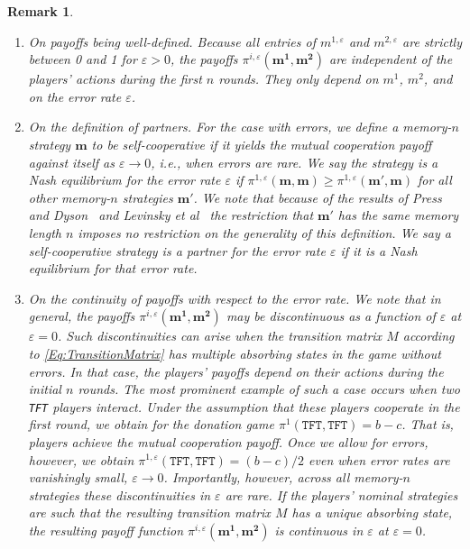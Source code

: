 \documentclass[9pt,twoside,lineno]{pnas-new}
\theoremstyle{plainCl1}
\theoremstyle{plainCl2}
\newtheorem{remark}{Remark}
\def\tft{\texttt{TFT}}
\begin{document}
\begin{remark} \label{Rem:Errors}
\begin{enumerate}[label=({\it \roman*})]

\item {\it On payoffs being well-defined.} Because all entries of $m^{1,\varepsilon}$ and $m^{2,\varepsilon}$ are strictly between 0 and 1 for $\varepsilon\!>\!0$, the payoffs $\pi^{i,\varepsilon}(\mathbf{m^1},\mathbf{m^2})$ are independent of the players' actions during the first $n$ rounds. They only depend on $m^{1}$, $m^{2}$, and on the error rate $\varepsilon$. 

\item {\it On the definition of partners.} For the case with errors, we define a memory-$n$ strategy $\mathbf{m}$ to be self-cooperative if it yields the mutual cooperation payoff against itself as $\varepsilon\rightarrow 0$, i.e., when errors are rare. 
We say the strategy is a Nash equilibrium for the error rate $\varepsilon$ if $\pi^{1,\varepsilon}(\mathbf{m},\mathbf{m}) \ge \pi^{1,\varepsilon}(\mathbf{m'},\mathbf{m})$ for all other memory-$n$ strategies $\mathbf{m'}$. We note that because of the results of Press and Dyson~\citep{press:PNAS:2012} and Levinsky et al~\citep{Levinsky:IJGT:2020} the restriction that $\mathbf{m'}$ has the same memory length $n$ imposes no restriction on the generality of this definition. We say a self-cooperative strategy is a partner for the error rate $\varepsilon$ if it is a Nash equilibrium for that error rate. 

\item {\it On the continuity of payoffs with respect to the error rate.} 
We note that in general, the payoffs $\pi^{i,\varepsilon}(\mathbf{m^1},\mathbf{m^2})$ may be discontinuous as a function of $\varepsilon$ at $\varepsilon\!=\!0$. 
Such discontinuities can arise when the transition matrix $M$ according to \eqref{Eq:TransitionMatrix} has multiple absorbing states in the game without errors. 
In that case, the players' payoffs depend on their actions during the initial $n$ rounds. 
The most prominent example of such a case occurs when two \tft{} players interact. 
Under the assumption that these players cooperate in the first round, we obtain for the donation game $\pi^{1}(\tft,\tft{})\!=\!b\!-\!c$.
That is, players achieve the mutual cooperation payoff. 
Once we allow for errors, however, we obtain $\pi^{1,\varepsilon}(\tft,\tft)\!=\!(b\!-\!c)/2$ even when error rates are vanishingly small, $\varepsilon\!\rightarrow\!0$. 
Importantly, however, across all memory-$n$ strategies these discontinuities in $\varepsilon$ are rare. 
If the players' nominal strategies are such that the resulting transition matrix $M$ has a unique absorbing state, the resulting payoff function $\pi^{i,\varepsilon}(\mathbf{m^1},\mathbf{m^2})$ is continuous in $\varepsilon$ at $\varepsilon\!=\!0$. 


\end{enumerate}
\end{remark}
\end{document}
